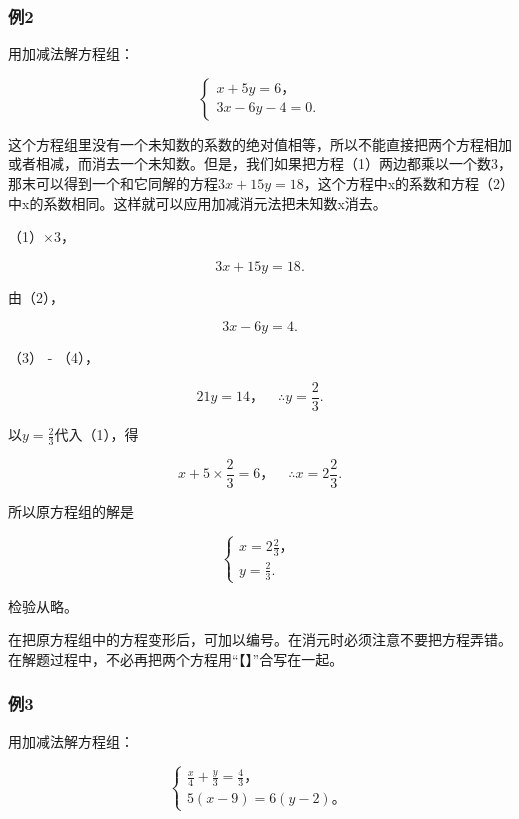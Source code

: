 \subsubsection{例2}

用加减法解方程组：

\[
\left\{ \begin{array}{l} x + 5 y = 6\text{，} \\ 3 x - 6 y - 4 = 0. \end{array} \right. \tag{1}
\]

这个方程组里没有一个未知数的系数的绝对值相等，所以不能直接把两个方程相加或者相减，而消去一个未知数。但是，我们如果把方程（1）两边都乘以一个数3，那末可以得到一个和它同解的方程\(3x + 15y = 18\)，这个方程中x的系数和方程（2）中x的系数相同。这样就可以应用加减消元法把未知数x消去。

 （1）\(\times 3\)，

\[
3 x + 15 y = 18. \tag{3}
\]

由（2），

\[
3 x - 6 y = 4. \tag{4}
\]

（3） - （4），

\[
21 y = 14\text{，} \quad \therefore y = \frac{2}{3}.
\]

以\(y = \frac{2}{3}\)代入（1），得

\[
x + 5 \times \frac{2}{3} = 6\text{，} \quad \therefore x = 2 \frac{2}{3}.
\]

所以原方程组的解是

\[
\left\{ \begin{array}{l} x = 2 \frac{2}{3}\text{，} \\ y = \frac{2}{3}. \end{array} \right.
\]

检验从略。

在把原方程组中的方程变形后，可加以编号。在消元时必须注意不要把方程弄错。在解题过程中，不必再把两个方程用``【】''合写在一起。

\subsubsection{例3}

用加减法解方程组：

\[
\left\{ \begin{array}{l} \frac{x}{4} + \frac{y}{3} = \frac{4}{3}\text{，} \\ 5 (x - 9) = 6 (y - 2)\text{。} \end{array} \right. \tag{1}
\]

